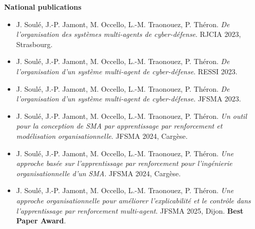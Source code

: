 \documentclass[a4paper,10pt,twocolumn]{article}
\begin{document}
\noindent\textbf{National publications}
\begin{itemize}
    \item J. Soulé, J.-P. Jamont, M. Occello, L.-M. Traonouez, P. Théron.
          \textit{De l'organisation des systèmes multi-agents de cyber-défense}.
          RJCIA 2023, Strasbourg.
    \item J. Soulé, J.-P. Jamont, M. Occello, L.-M. Traonouez, P. Théron.
          \textit{De l'organisation d'un système multi-agent de cyber-défense}.
          RESSI 2023.
    \item J. Soulé, J.-P. Jamont, M. Occello, L.-M. Traonouez, P. Théron.
          \textit{De l'organisation d'un système multi-agent de cyber-défense}.
          JFSMA 2023.
    \item J. Soulé, J.-P. Jamont, M. Occello, L.-M. Traonouez, P. Théron.
          \textit{Un outil pour la conception de SMA par apprentissage par renforcement et modélisation organisationnelle}.
          JFSMA 2024, Cargèse.
    \item J. Soulé, J.-P. Jamont, M. Occello, L.-M. Traonouez, P. Théron.
          \textit{Une approche basée sur l’apprentissage par renforcement pour l’ingénierie organisationnelle d’un SMA}.
          JFSMA 2024, Cargèse.
    \item J. Soulé, J.-P. Jamont, M. Occello, L.-M. Traonouez, P. Théron.
          \textit{Une approche organisationnelle pour améliorer l’explicabilité et le contrôle dans l’apprentissage par renforcement multi-agent}.
          JFSMA 2025, Dijon. \textbf{Best Paper Award}.
\end{itemize}







\end{document}
